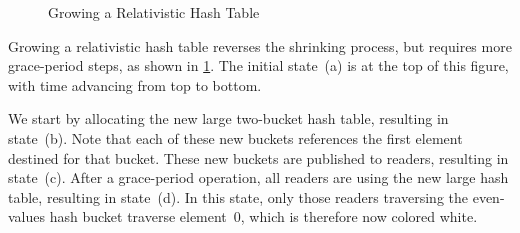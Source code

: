 \begin{figure}
\centering
{}
\caption{Growing a Relativistic Hash Table}
\label{fig:datastruct:Growing a Relativistic Hash Table}
\end{figure}

Growing a relativistic hash table reverses the shrinking process,
but requires more grace-period steps, as shown in
\cref{fig:datastruct:Growing a Relativistic Hash Table}.
The initial state~(a) is at the top of this figure, with time advancing
from top to bottom.

We start by allocating the new large two-bucket hash table, resulting
in state~(b).
Note that each of these new buckets references the first element destined
for that bucket.
These new buckets are published to readers, resulting in state~(c).
After a grace-period operation, all readers are using the new large
hash table, resulting in state~(d).
In this state, only those readers traversing the even-values hash bucket
traverse element~0, which is therefore now colored white.

